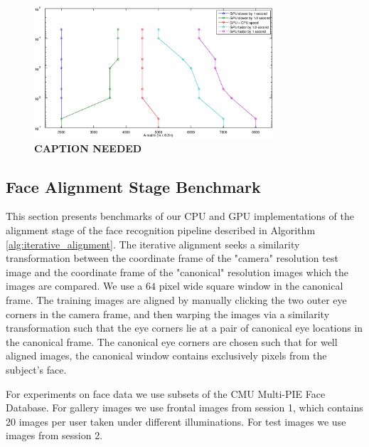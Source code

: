 \documentclass[10pt,twocolumn,letterpaper]{article}
\begin{document}
\begin{figure}
\begin{center}
\includegraphics[width=3.5in]{results/random_data/size_vs_speed_crossover_ratio_2}
\end{center}
\caption{\bf CAPTION NEEDED}
\label{fig:random_data2}
\end{figure}


\subsection{Face Alignment Stage Benchmark} \label{sec:alignment_benchmark}
This section presents benchmarks of our CPU and GPU implementations of the
alignment stage of the face recognition pipeline described in Algorithm
\ref{alg:iterative_alignment}.  The iterative alignment seeks a similarity
transformation between the coordinate frame of the "camera" resolution test
image and the coordinate frame of the "canonical" resolution images which the
images are compared.  We use a $64$ pixel wide square window in the canonical
frame.  The training images are aligned by manually clicking the two outer eye
corners in the camera frame, and then warping the images via a similarity
transformation such that the eye corners lie at a pair of canonical eye
locations in the canonical frame.  The canonical eye corners are chosen such
that for well aligned images, the canonical window contains exclusively pixels
from the subject's face. 

For experiments on face data we use subsets of the CMU Multi-PIE Face Database.
For gallery images we use frontal images from session 1, which contains 20
images per user taken under different illuminations. For test images we use
images from session 2.  
\end{document}
